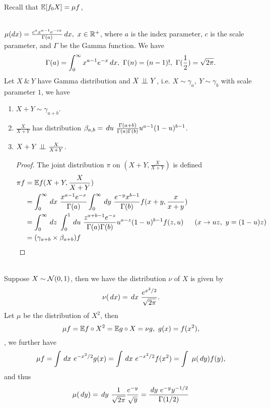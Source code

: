 \np Recall that $\mathbb{E}[f_0 X] = \mu f$,
\begin{example}\ \\
$\mu(dx) = \frac{c^a x^{a - 1} e^{-cx}}{\Gamma(a)} \,dx,\ x \in \mathbb{R}^+$, where $a$ is the index parameter, $c$ is the scale parameter, and $\Gamma$ be the Gamma function. We have
\begin{equation*}
    \Gamma(a) = \int_0^\infty x^{a-1} e^{-x} \dr x,\ \Gamma(n) = (n-1)!,\ \Gamma(\frac{1}{2}) = \sqrt{2\pi}.
\end{equation*}
Let $X\ \&\ Y$ have Gamma distribution and $X \perp \!\!\! \perp Y$, i.e. $X \sim \gamma_a,\ Y \sim \gamma_b$ with scale parameter $1$, we have
\begin{enumerate}[label = (\alph*)]
    \item $X + Y \sim \gamma_{a + b}$.
    \item $\frac{X}{X+Y}$ has distribution $\beta_{a,b} =\dr u\ \frac{\Gamma(a+b)}{\Gamma(a) \Gamma(b)}u^{a - 1} (1 - u)^{b-1}$.
    \item $X + Y \perp \!\!\! \perp \frac{X}{X+Y}$.
    \begin{proof}
    The joint distribution $\pi$ on $(X+Y, \frac{X}{X+Y})$ is defined
    \begin{align*}
        \pi f &= \E f(X+Y, \frac{X}{X+Y})\\ 
        &= \int_0^\infty \dr x\ \frac{x^{a - 1} e^{-x}}{\Gamma(a)} \int_0^\infty \dr y\ \frac{e^{-y} x^{b - 1}}{\Gamma(b)} f(x + y, \frac{x}{x + y})\\
        &= \int_0^\infty \dr z\ \int_0^1 \dr u\ \frac{z^{a+b-1}e^{-z}}{\Gamma(a) \Gamma(b)} u^{a-z} (1 - u)^{b-1} f(z,u)  &(x \to uz,\ y = (1 - u)z)\\
        &= (\gamma_{a+b} \times \beta_{a+b})f
    \end{align*}
    \end{proof}
\end{enumerate}
\end{example}

\begin{example}\ \\
Suppose $X \sim \mathcal{N}(0,1)$, then we have the distribution $\nu$ of $X$ is given by
\begin{equation*}
    \nu(\dr x) = \dr x\ \frac{e^{x^2/2}}{\sqrt{2\pi}}.
\end{equation*}
Let $\mu$ be the distribution of $X^2$, then
\begin{equation*}
    \mu f = \mathbb{E} f \circ X^2 = \mathbb{E} g \circ X = \nu g,\ g(x) = f(x^2),
\end{equation*},
we further have 
\begin{equation*}
    \mu f = \int \dr x\ e^{-x^2/2} g(x) = \int \dr x\ e^{-x^2/2} f(x^2) = \int\ \mu( \dr y) f(y),
\end{equation*}
and thus
\begin{equation*}
    \mu(\,dy) = \,dy\ \frac{1}{\sqrt{2\pi}} \frac{e^{-y}}{\sqrt{y}} = \frac{\,dy\ e^{-y} y^{-1/2}}{\Gamma(1/2)}
\end{equation*}
\end{example}

